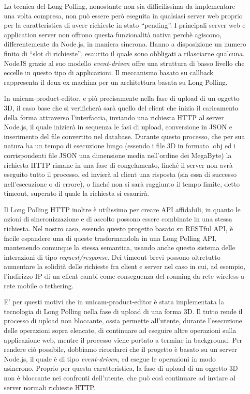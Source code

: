 La tecnica del Long Polling, nonostante non sia difficilissima da implementare una volta compresa, non può essere però eseguita in qualsiasi server web proprio per la caratteristica di avere richieste in stato “pending”. I principali server web e application server non offrono questa funzionalità nativa perchè agiscono, differentemente da Node.js, in maniera sincrona. Hanno a disposizione un numero finito di “slot di richieste”, esaurito il quale sono obbligati a rilasciarne qualcuna.
NodeJS grazie al suo modello \emph{event-driven} offre una struttura di basso livello che eccelle in questo tipo di applicazioni. Il meccanismo basato su callback rappresenta il deux ex machina per un architettura basata su Long Polling.

In unicam-product-editor, e più precisamente nella fase di upload di un oggetto 3D, il caso base che si verificherà sarà quello del client che inizia il caricamento della forma attraverso l'interfaccia, inviando una richiesta HTTP al server Node.js, il quale inizierà in sequenza le fasi di upload, conversione in JSON e inserimento del file convertito nel database. Durante questo processo, che per sua natura ha un tempo di esecuzione lungo (essendo i file 3D in formato .obj ed i corrispondenti file JSON una dimensione media nell'ordine dei MegaByte) la richiesta HTTP rimane in una fase di congelamento, finché il server non avrà eseguito tutto il processo, ed invierà al client una risposta (sia essa di successo nell'esecuzione o di errore), o finché non si sarà raggiunto il tempo limite, detto timeout, superato il quale la richiesta si esaurirà.

Il Long Polling HTTP inoltre è utilissimo per creare API affidabili, in quanto le azioni di sincronizzazione e di ascolto possono essere combinate in una stessa richiesta. Nel nostro caso, essendo questo progetto basato su RESTful API, è facile espandere una di queste trasformandola in una Long Polling API, mantenendo comunque la stessa semantica, usando anche questo sistema delle interazioni di tipo \emph{request/response}. Dei timeout brevi possono oltretutto aumentare la solidità delle richieste fra client e server nel caso in cui, ad esempio, l'indirizzo IP di un client cambi come conseguenza del roaming da rete wireless a rete mobile o tethering.

E' per questi motivi che in unicam-product-editor è stata implementata la tecnologia di Long Polling nella fase di upload di una forma 3D.
Il tutto rende il processo di upload non bloccante, ossia permette all'utente, durante l'esecuzione delle operazioni sopra elencate, di continuare ad eseguire altre operazioni sulla applicazione web, mentre il processo viene portato a termine in background.
Per rendere ciò possibile, dobbiamo ricordarci che il progetto è basato su un server Node.js, il quale è di tipo \emph{event-driven}, ed esegue le operazioni in modo asincrono. Proprio per questa caratteristica, la fase di upload di un oggetto 3D non è bloccante nei confronti dell'utente, che può così continuare ad inviare al server normali richieste HTTP.

